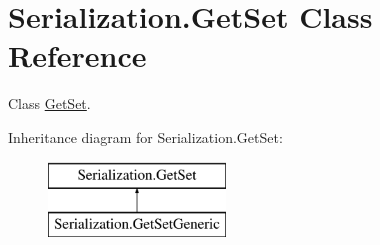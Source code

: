 \hypertarget{class_serialization_1_1_get_set}{}\section{Serialization.\+Get\+Set Class Reference}
\label{class_serialization_1_1_get_set}


Class \hyperlink{class_serialization_1_1_get_set}{Get\+Set}.  


Inheritance diagram for Serialization.\+Get\+Set\+:\begin{figure}[H]
\begin{center}
\leavevmode
\includegraphics[height=2.000000cm]{class_serialization_1_1_get_set}
\end{center}
\end{figure}
